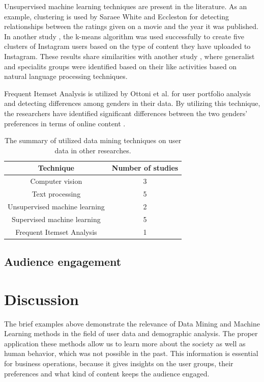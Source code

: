 \documentclass[conference]{IEEEtran}
\begin{document}
  Unsupervised machine learning techniques are present in the literature. As an example, clustering is used by Saraee White and Eccleston \cite{saraee2004data} for detecting relationships between the ratings given on a movie and the year it was published. In another study \cite{hu2014we}, the k-means algorithm was used successfully to create five clusters of Instagram users based on the type of content they have uploaded to Instagram. These results share similarities with another study \cite{jang2015no}, where generalist and specialits groups were identified based on their like activities based on natural language processing techniques. 

  Frequent Itemset Analysis is utilized by Ottoni et al. \cite{ottoni2013ladies} for user portfolio analysis and detecting differences among genders in their data. By utilizing this technique, the researchers have identified significant differences between the two genders' preferences in terms of online content \cite{ottoni2013ladies}. 

  \begin{table}[!t]
    \renewcommand{\arraystretch}{1.5}
    \caption{The summary of utilized data mining techniques on user data in other researches.}
    \label{table_of_techniques}
    \centering
      \begin{tabular}{c||c}
        Technique & Number of studies \\ 
        \hline
        Computer vision & 3  \\
        Text processing & 5 \\
        Unsupervised machine learning & 2 \\
        Supervised machine learning & 5 \\
        Frequent Itemset Analysis & 1
      \end{tabular}
  \end{table}

\subsection{Audience engagement}

\section{Discussion}
The brief examples above demonstrate the relevance of Data Mining and Machine Learning methods in the field of user data and demographic analysis. The proper application these methods allow us to learn more about the society as well as human behavior, which was not possible in the past. This information is essential for business operations, because it gives insights on the user groups, their preferences and what kind of content keeps the audience engaged. 
\end{document}
